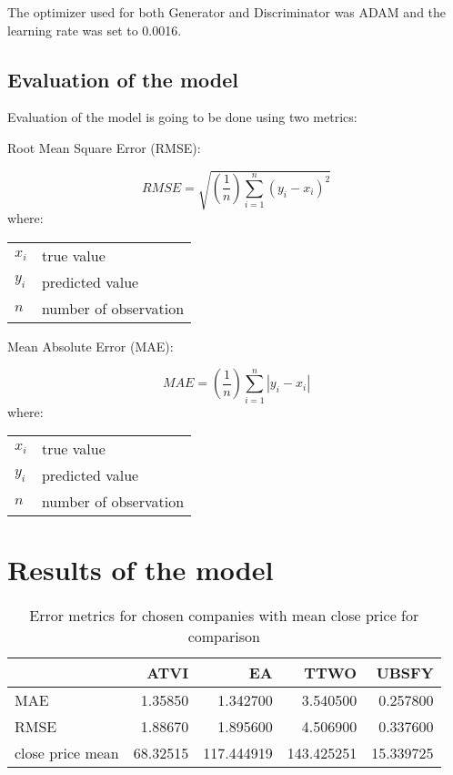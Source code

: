 \documentclass[11pt]{article} %
\makeatletter
\newenvironment{conditions}
  {\par\vspace{\abovedisplayskip}\noindent\begin{tabular}{>{$}l<{$} @{${}={}$} l}}
  {\end{tabular}\par\vspace{\belowdisplayskip}}
\makeatother
\begin{document}
The optimizer used for both Generator and Discriminator was ADAM and the learning rate was set to 0.0016.

\subsection{Evaluation of the model}
Evaluation of the model is going to be done using two metrics:  \\ 

\begin{center}   Root Mean Square Error (RMSE):  \end{center}
\begin{equation}  RMSE = \sqrt{(\frac{1}{n})\sum_{i=1}^{n}(y_{i} - x_{i})^{2}} \end{equation}
where:
\begin{conditions}
 x_i     &  true value \\
 y_i     &  predicted value \\   
 n &  number of observation
\end{conditions}

\begin{center}  Mean Absolute Error (MAE): \end{center}
\begin{equation} MAE =(\frac{1}{n})\sum_{i=1}^{n}\left | y_{i} - x_{i} \right | \end{equation}
where:
\begin{conditions}
 x_i     &  true value \\
 y_i     &  predicted value \\   
 n &  number of observation
\end{conditions}
\section{Results of the model}
\begin{table}
\centering
\caption{Error metrics for chosen companies with mean close price for comparison}
\begin{tabular}{lrrrr}
\toprule
{} &      ATVI &          EA &        TTWO &      UBSFY \\
\midrule
MAE              &   1.35850 &    1.342700 &    3.540500 &   0.257800 \\
RMSE             &   1.88670 &    1.895600 &    4.506900 &   0.337600 \\
\midrule
close price mean &  68.32515 &  117.444919 &  143.425251 &  15.339725 \\
\bottomrule
\end{tabular}
\end{table}
\end{document}
